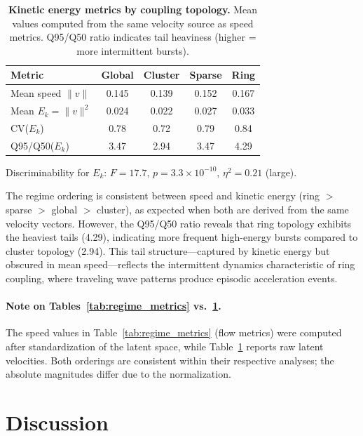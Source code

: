 \documentclass[5p,twocolumn,authoryear]{elsarticle}
\begin{document}
\begin{table}[h]
\centering
\caption{\textbf{Kinetic energy metrics by coupling topology.} Mean values computed from the same velocity source as speed metrics. Q95/Q50 ratio indicates tail heaviness (higher = more intermittent bursts).}
\label{tab:kinetic_energy}
\small
\begin{tabular}{lcccc}
\toprule
\textbf{Metric} & \textbf{Global} & \textbf{Cluster} & \textbf{Sparse} & \textbf{Ring} \\
\midrule
Mean speed $\|v\|$ & 0.145 & 0.139 & 0.152 & 0.167 \\
Mean $E_k = \|v\|^2$ & 0.024 & 0.022 & 0.027 & 0.033 \\
CV($E_k$) & 0.78 & 0.72 & 0.79 & 0.84 \\
Q95/Q50($E_k$) & 3.47 & 2.94 & 3.47 & 4.29 \\
\bottomrule
\end{tabular}
\vspace{0.5em}

\footnotesize{Discriminability for $E_k$: $F = 17.7$, $p = 3.3 \times 10^{-10}$, $\eta^2 = 0.21$ (large).}
\end{table}

The regime ordering is consistent between speed and kinetic energy (ring $>$ sparse $>$ global $>$ cluster), as expected when both are derived from the same velocity vectors. However, the Q95/Q50 ratio reveals that ring topology exhibits the heaviest tails (4.29), indicating more frequent high-energy bursts compared to cluster topology (2.94). This tail structure---captured by kinetic energy but obscured in mean speed---reflects the intermittent dynamics characteristic of ring coupling, where traveling wave patterns produce episodic acceleration events.

\paragraph{Note on Tables~\ref{tab:regime_metrics} vs.\ \ref{tab:kinetic_energy}.}
The speed values in Table~\ref{tab:regime_metrics} (flow metrics) were computed after standardization of the latent space, while Table~\ref{tab:kinetic_energy} reports raw latent velocities. Both orderings are consistent within their respective analyses; the absolute magnitudes differ due to the normalization.

\section{Discussion}
\label{sec:discussion}
\end{document}
